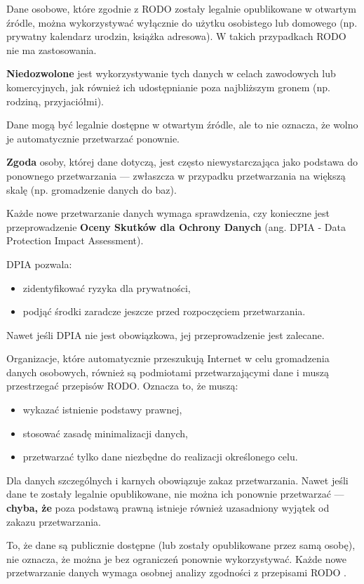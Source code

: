Dane osobowe, które zgodnie z RODO zostały legalnie opublikowane w otwartym źródle, można wykorzystywać wyłącznie do użytku osobistego lub domowego (np. prywatny kalendarz urodzin, książka adresowa). W takich przypadkach RODO nie ma zastosowania.

\textbf{Niedozwolone} jest wykorzystywanie tych danych w celach zawodowych lub komercyjnych, jak również ich udostępnianie poza najbliższym gronem (np. rodziną, przyjaciółmi).

Dane mogą być legalnie dostępne w otwartym źródle, ale to nie oznacza, że wolno je automatycznie przetwarzać ponownie.

\textbf{Zgoda} osoby, której dane dotyczą, jest często niewystarczająca jako podstawa do ponownego przetwarzania — zwłaszcza w przypadku przetwarzania na większą skalę (np. gromadzenie danych do baz).

Każde nowe przetwarzanie danych wymaga sprawdzenia, czy konieczne jest przeprowadzenie \textbf{Oceny Skutków dla Ochrony Danych} (ang. DPIA - Data Protection Impact Assessment).

DPIA pozwala:
\begin{itemize}
    \item zidentyfikować ryzyka dla prywatności,
    \item podjąć środki zaradcze jeszcze przed rozpoczęciem przetwarzania.
\end{itemize}

Nawet jeśli DPIA nie jest obowiązkowa, jej przeprowadzenie jest zalecane.

Organizacje, które automatycznie przeszukują Internet w celu gromadzenia danych osobowych, również są podmiotami przetwarzającymi dane i muszą przestrzegać przepisów RODO. Oznacza to, że muszą:
\begin{itemize}
    \item wykazać istnienie podstawy prawnej,
    \item stosować zasadę minimalizacji danych,
    \item przetwarzać tylko dane niezbędne do realizacji określonego celu.
\end{itemize}

Dla danych szczególnych i karnych obowiązuje zakaz przetwarzania. Nawet jeśli dane te zostały legalnie opublikowane, nie można ich ponownie przetwarzać — \textbf{chyba, że} poza podstawą prawną istnieje również uzasadniony wyjątek od zakazu przetwarzania.

To, że dane są publicznie dostępne (lub zostały opublikowane przez samą osobę), nie oznacza, że można je bez ograniczeń ponownie wykorzystywać. Każde nowe przetwarzanie danych wymaga osobnej analizy zgodności z przepisami RODO \cite{SOURCES}.

